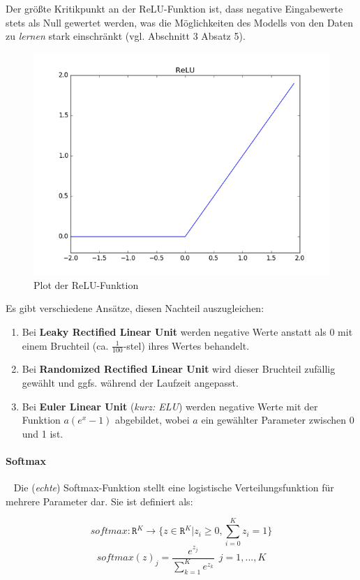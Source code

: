 Der größte Kritikpunkt an der ReLU-Funktion ist, dass negative Eingabewerte stets als Null gewertet werden, was die Möglichkeiten des Modells von den Daten zu \textit{lernen} stark einschränkt (vgl. \cite{sigmoid} Abschnitt 3 Absatz 5). 
\begin{figure}[h]
	\begin{center}
		\includegraphics[width=0.5\linewidth]{Bilder/ReluPlot}
		\caption[Rectified Linear Unit: \url{
			https://leonardoaraujosantos.gitbooks.io/artificial-inteligence/content/relu_layer.html}]{Plot der ReLU-Funktion}
		\label{fig:ReLUplot}
	\end{center}
\end{figure}  
Es gibt verschiedene Ansätze, diesen Nachteil auszugleichen: ~\newline
\begin{enumerate}
	 \item Bei \textbf{Leaky Rectified Linear Unit} werden negative Werte anstatt als 0 mit einem Bruchteil (ca. $\frac{1}{100}$-stel) ihres Wertes behandelt. 
	\item Bei \textbf{Randomized Rectified Linear Unit} wird dieser Bruchteil zufällig gewählt und ggfs. während der Laufzeit angepasst. 
	\item Bei \textbf{Euler Linear Unit} (\textit{kurz: ELU}) werden negative Werte mit der Funktion $a(e^x-1)$ abgebildet,  wobei $a$ ein gewählter Parameter zwischen 0 und 1 ist.
\end{enumerate}
 
\paragraph{Softmax}~\newline
Die (\textit{echte}) Softmax-Funktion stellt eine logistische Verteilungsfunktion für mehrere Parameter dar. Sie ist definiert als: 

\begin{equation}
	\label{eq:Softmax}
	softmax: \mathtt{R}^K \rightarrow \lbrace z \in \mathtt{R}^K | z_i \geq 0 , \sum_{i=0}^{K} z_i = 1 \rbrace
\end{equation}
\begin{equation}
\label{eq:Softmax2}
	softmax(z)_j = \dfrac{e^{z_j}}{\sum_{k=1}^{K}e^{z_k}}  \ \  j = 1, ... , K
\end{equation}

